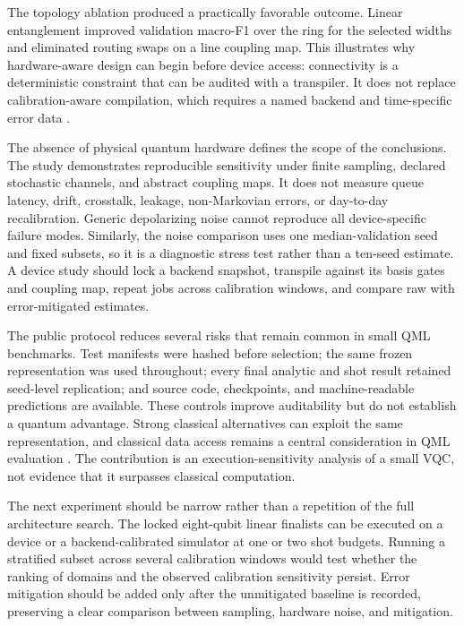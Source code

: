 \documentclass[pdflatex,sn-mathphys-num]{sn-jnl}
\begin{document}
The topology ablation produced a practically favorable outcome. Linear entanglement improved validation macro-F1 over the ring for the selected widths and eliminated routing swaps on a line coupling map. This illustrates why hardware-aware design can begin before device access: connectivity is a deterministic constraint that can be audited with a transpiler. It does not replace calibration-aware compilation, which requires a named backend and time-specific error data \cite{MURALI-2019}.

The absence of physical quantum hardware defines the scope of the conclusions. The study demonstrates reproducible sensitivity under finite sampling, declared stochastic channels, and abstract coupling maps. It does not measure queue latency, drift, crosstalk, leakage, non-Markovian errors, or day-to-day recalibration. Generic depolarizing noise cannot reproduce all device-specific failure modes. Similarly, the noise comparison uses one median-validation seed and fixed subsets, so it is a diagnostic stress test rather than a ten-seed estimate. A device study should lock a backend snapshot, transpile against its basis gates and coupling map, repeat jobs across calibration windows, and compare raw with error-mitigated estimates.

The public protocol reduces several risks that remain common in small QML benchmarks. Test manifests were hashed before selection; the same frozen representation was used throughout; every final analytic and shot result retained seed-level replication; and source code, checkpoints, and machine-readable predictions are available. These controls improve auditability but do not establish a quantum advantage. Strong classical alternatives can exploit the same representation, and classical data access remains a central consideration in QML evaluation \cite{HUANG-2021,THANASILP-2024}. The contribution is an execution-sensitivity analysis of a small VQC, not evidence that it surpasses classical computation.

The next experiment should be narrow rather than a repetition of the full architecture search. The locked eight-qubit linear finalists can be executed on a device or a backend-calibrated simulator at one or two shot budgets. Running a stratified subset across several calibration windows would test whether the ranking of domains and the observed calibration sensitivity persist. Error mitigation should be added only after the unmitigated baseline is recorded, preserving a clear comparison between sampling, hardware noise, and mitigation.
\end{document}
